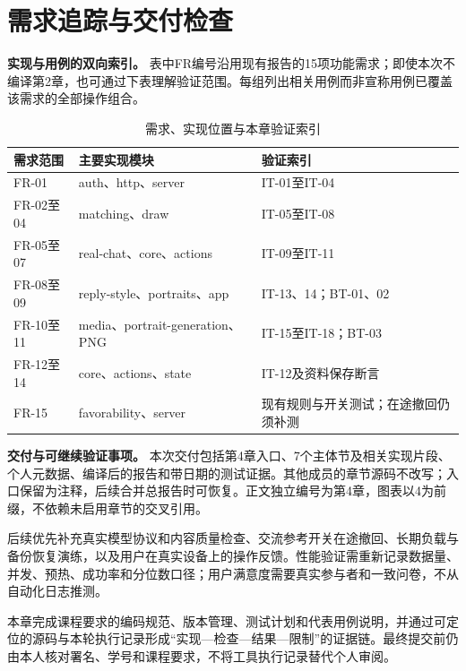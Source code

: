 \clearpage
\section{需求追踪与交付检查}

\label{sec:impl-20-trace}
\par\medskip\noindent\textbf{实现与用例的双向索引。}
表中FR编号沿用现有报告的15项功能需求；即使本次不编译第2章，也可通过下表理解验证范围。每组列出相关用例而非宣称用例已覆盖该需求的全部操作组合。

\begin{table}[H]\centering\small
\caption{需求、实现位置与本章验证索引}
\begin{tabularx}{\linewidth}{@{}p{24mm}p{39mm}X@{}}\toprule
需求范围 & 主要实现模块 & 验证索引 \\ \midrule
FR-01 & auth、http、server & IT-01至IT-04 \\
FR-02至04 & matching、draw & IT-05至IT-08 \\
FR-05至07 & real-chat、core、actions & IT-09至IT-11 \\
FR-08至09 & reply-style、portraits、app & IT-13、14；BT-01、02 \\
FR-10至11 & media、portrait-generation、PNG & IT-15至IT-18；BT-03 \\
FR-12至14 & core、actions、state & IT-12及资料保存断言 \\
FR-15 & favorability、server & 现有规则与开关测试；在途撤回仍须补测 \\ \bottomrule
\end{tabularx}\end{table}

\par\medskip\noindent\textbf{交付与可继续验证事项。}
本次交付包括第4章入口、7个主体节及相关实现片段、个人元数据、编译后的报告和带日期的测试证据。其他成员的章节源码不改写；入口保留为注释，后续合并总报告时可恢复。正文独立编号为第4章，图表以4为前缀，不依赖未启用章节的交叉引用。

后续优先补充真实模型协议和内容质量检查、交流参考开关在途撤回、长期负载与备份恢复演练，以及用户在真实设备上的操作反馈。性能验证需重新记录数据量、并发、预热、成功率和分位数口径；用户满意度需要真实参与者和一致问卷，不从自动化日志推测。

本章完成课程要求的编码规范、版本管理、测试计划和代表用例说明，并通过可定位的源码与本轮执行记录形成“实现—检查—结果—限制”的证据链。最终提交前仍由本人核对署名、学号和课程要求，不将工具执行记录替代个人审阅。
